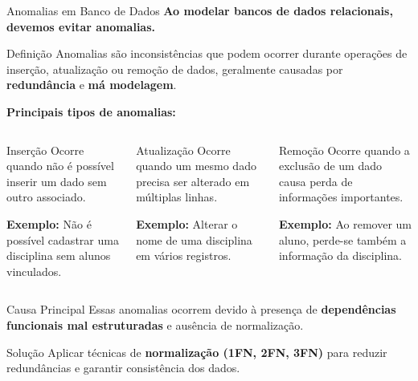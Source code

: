 \documentclass[9pt]{beamer}
\begin{document}
\begin{frame}{Anomalias em Banco de Dados}
\small
\textbf{Ao modelar bancos de dados relacionais, devemos evitar anomalias.}

\vspace{0.4cm}

\begin{block}{Definição}
Anomalias são inconsistências que podem ocorrer durante operações de inserção, atualização ou remoção de dados, geralmente causadas por \textbf{redundância} e \textbf{má modelagem}.
\end{block}

\vspace{0.3cm}

\textbf{Principais tipos de anomalias:}

\vspace{0.3cm}

\begin{columns}
\begin{block}{Inserção}
\footnotesize
Ocorre quando não é possível inserir um dado sem outro associado.

\textbf{Exemplo:}
Não é possível cadastrar uma disciplina sem alunos vinculados.
\end{block}

\begin{block}{Atualização}
\footnotesize
Ocorre quando um mesmo dado precisa ser alterado em múltiplas linhas.

\textbf{Exemplo:}
Alterar o nome de uma disciplina em vários registros.
\end{block}

\begin{block}{Remoção}
\footnotesize
Ocorre quando a exclusão de um dado causa perda de informações importantes.

\textbf{Exemplo:}
Ao remover um aluno, perde-se também a informação da disciplina.
\end{block}
\end{columns}

\vspace{0.4cm}

\begin{alertblock}{Causa Principal}
Essas anomalias ocorrem devido à presença de \textbf{dependências funcionais mal estruturadas} e ausência de normalização.
\end{alertblock}

\vspace{0.2cm}

\begin{block}{Solução}
Aplicar técnicas de \textbf{normalização (1FN, 2FN, 3FN)} para reduzir redundâncias e garantir consistência dos dados.
\end{block}

\end{frame}
\end{document}
